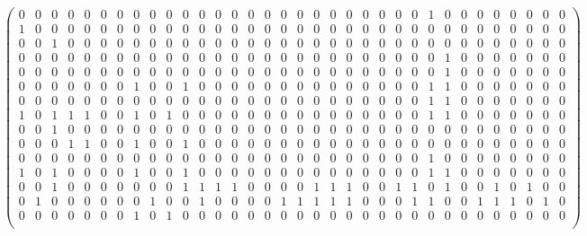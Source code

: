 \documentclass[runningheads]{llncs}
\begin{document}
\begin{figure}
\[\begin{pmatrix}
0 & 0 & 0 & 0 & 0 & 0 & 0 & 0 & 0 & 0 & 0 & 0 & 0 & 0 & 0 & 0 & 0 & 0 & 0 & 0 & 0 & 0 & 0 & 0 & 0 & 1 & 0 & 0 & 0 & 0 & 0 & 0 & 0 & 0 \\
1 & 0 & 0 & 0 & 0 & 0 & 0 & 0 & 0 & 0 & 0 & 0 & 0 & 0 & 0 & 0 & 0 & 0 & 0 & 0 & 0 & 0 & 0 & 0 & 0 & 0 & 0 & 0 & 0 & 0 & 0 & 0 & 0 & 0 \\
0 & 0 & 1 & 0 & 0 & 0 & 0 & 0 & 0 & 0 & 0 & 0 & 0 & 0 & 0 & 0 & 0 & 0 & 0 & 0 & 0 & 0 & 0 & 0 & 0 & 0 & 0 & 0 & 0 & 0 & 0 & 0 & 0 & 0 \\
0 & 0 & 0 & 0 & 0 & 0 & 0 & 0 & 0 & 0 & 0 & 0 & 0 & 0 & 0 & 0 & 0 & 0 & 0 & 0 & 0 & 0 & 0 & 0 & 0 & 0 & 1 & 0 & 0 & 0 & 0 & 0 & 0 & 0 \\
0 & 0 & 0 & 0 & 0 & 0 & 0 & 0 & 0 & 0 & 0 & 0 & 0 & 0 & 0 & 0 & 0 & 0 & 0 & 0 & 0 & 0 & 0 & 0 & 0 & 0 & 1 & 0 & 0 & 0 & 0 & 0 & 0 & 0 \\
0 & 0 & 0 & 0 & 0 & 0 & 0 & 1 & 0 & 0 & 1 & 0 & 0 & 0 & 0 & 0 & 0 & 0 & 0 & 0 & 0 & 0 & 0 & 0 & 0 & 1 & 1 & 0 & 0 & 0 & 0 & 0 & 0 & 0 \\
0 & 0 & 0 & 0 & 0 & 0 & 0 & 0 & 0 & 0 & 0 & 0 & 0 & 0 & 0 & 0 & 0 & 0 & 0 & 0 & 0 & 0 & 0 & 0 & 0 & 1 & 1 & 0 & 0 & 0 & 0 & 0 & 0 & 0 \\
1 & 0 & 1 & 1 & 1 & 0 & 0 & 1 & 0 & 1 & 0 & 0 & 0 & 0 & 0 & 0 & 0 & 0 & 0 & 0 & 0 & 0 & 0 & 0 & 0 & 1 & 1 & 0 & 0 & 0 & 0 & 0 & 0 & 0 \\
0 & 0 & 1 & 0 & 0 & 0 & 0 & 0 & 0 & 0 & 0 & 0 & 0 & 0 & 0 & 0 & 0 & 0 & 0 & 0 & 0 & 0 & 0 & 0 & 0 & 0 & 0 & 0 & 0 & 0 & 0 & 0 & 0 & 0 \\
0 & 0 & 0 & 1 & 1 & 0 & 0 & 1 & 0 & 0 & 1 & 0 & 0 & 0 & 0 & 0 & 0 & 0 & 0 & 0 & 0 & 0 & 0 & 0 & 0 & 0 & 0 & 0 & 0 & 0 & 0 & 0 & 0 & 0 \\
0 & 0 & 0 & 0 & 0 & 0 & 0 & 0 & 0 & 0 & 0 & 0 & 0 & 0 & 0 & 0 & 0 & 0 & 0 & 0 & 0 & 0 & 0 & 0 & 0 & 1 & 0 & 0 & 0 & 0 & 0 & 0 & 0 & 0 \\
1 & 0 & 1 & 0 & 0 & 0 & 0 & 1 & 0 & 0 & 1 & 0 & 0 & 0 & 0 & 0 & 0 & 0 & 0 & 0 & 0 & 0 & 0 & 0 & 0 & 1 & 1 & 0 & 0 & 0 & 0 & 0 & 0 & 0 \\
0 & 0 & 1 & 0 & 0 & 0 & 0 & 0 & 0 & 0 & 1 & 1 & 1 & 1 & 0 & 0 & 0 & 0 & 1 & 1 & 1 & 0 & 0 & 1 & 1 & 0 & 1 & 0 & 0 & 1 & 0 & 1 & 0 & 0 \\
0 & 1 & 0 & 0 & 0 & 0 & 0 & 0 & 1 & 0 & 0 & 1 & 0 & 0 & 0 & 0 & 1 & 1 & 1 & 1 & 1 & 0 & 0 & 0 & 1 & 1 & 0 & 0 & 1 & 1 & 1 & 0 & 1 & 0 \\
0 & 0 & 0 & 0 & 0 & 0 & 0 & 1 & 0 & 1 & 0 & 0 & 0 & 0 & 0 & 0 & 0 & 0 & 0 & 0 & 0 & 0 & 0 & 0 & 0 & 0 & 0 & 0 & 0 & 0 & 0 & 0 & 0 & 0 \\

\end{pmatrix}\]
\end{figure}
\end{document}
